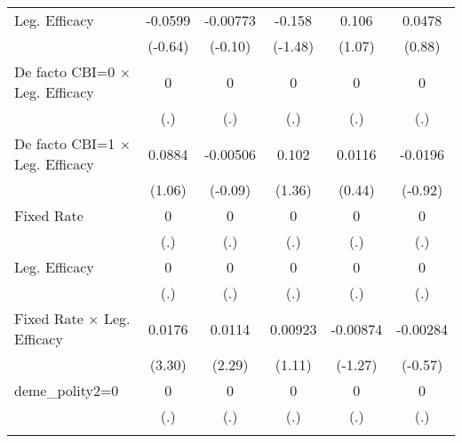 \begin{table}[htbp]
\begin{tabular}{l*{5}{c}}
\addlinespace
Leg. Efficacy                           &  -0.0599         & -0.00773         &   -0.158         &    0.106         &   0.0478         \\
                                        &  (-0.64)         &  (-0.10)         &  (-1.48)         &   (1.07)         &   (0.88)         \\
\addlinespace
De facto CBI=0 $\times$ Leg. Efficacy   &        0         &        0         &        0         &        0         &        0         \\
                                        &      (.)         &      (.)         &      (.)         &      (.)         &      (.)         \\
\addlinespace
De facto CBI=1 $\times$ Leg. Efficacy   &   0.0884         & -0.00506         &    0.102         &   0.0116         &  -0.0196         \\
                                        &   (1.06)         &  (-0.09)         &   (1.36)         &   (0.44)         &  (-0.92)         \\
\addlinespace
Fixed Rate                              &        0         &        0         &        0         &        0         &        0         \\
                                        &      (.)         &      (.)         &      (.)         &      (.)         &      (.)         \\
\addlinespace
Leg. Efficacy                           &        0         &        0         &        0         &        0         &        0         \\
                                        &      (.)         &      (.)         &      (.)         &      (.)         &      (.)         \\
\addlinespace
Fixed Rate $\times$ Leg. Efficacy       &   0.0176\sym{**} &   0.0114\sym{*}  &  0.00923         & -0.00874         & -0.00284         \\
                                        &   (3.30)         &   (2.29)         &   (1.11)         &  (-1.27)         &  (-0.57)         \\
\addlinespace
deme\_polity2=0                          &        0         &        0         &        0         &        0         &        0         \\
                                        &      (.)         &      (.)         &      (.)         &      (.)         &      (.)         \\
\addlinespace

\end{tabular}
\end{table}
